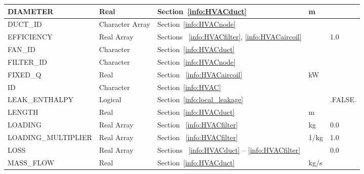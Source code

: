 \documentclass[11pt]{book}
\begin{document}
\begin{longtable}{@{\extracolsep{\fill}}|l|l|l|l|l|}
{\ct DIAMETER}                  & Real              & Section~\ref{info:HVACduct}                                                   &  m            &                \\ \hline
{\ct DUCT\_ID}                  & Character Array   & Section~\ref{info:HVACnode}                                                   &               &                \\ \hline
{\ct EFFICIENCY}                & Real Array        & Sections ~\ref{info:HVACfilter}, \ref{info:HVACaircoil}                       &               & 1.0            \\ \hline
{\ct FAN\_ID}                   & Character         & Section~\ref{info:HVACduct}                                                   &               &                \\ \hline
{\ct FILTER\_ID}                & Character         & Section~\ref{info:HVACnode}                                                   &               &                \\ \hline
{\ct FIXED\_Q}                  & Real              & Section ~\ref{info:HVACaircoil}                                               & kW            &                \\ \hline
{\ct ID}                        & Character         & Section~\ref{info:HVAC}                                                       &               &                \\ \hline
{\ct LEAK\_ENTHALPY}            & Logical           & Section~\ref{info:local_leakage}                                                   &               & {\ct .FALSE.}  \\ \hline
{\ct LENGTH}                    & Real              & Section~\ref{info:HVACduct}                                                   &  m            &                \\ \hline
{\ct LOADING}                   & Real Array        &  Section ~\ref{info:HVACfilter}                                               & kg            & 0.0            \\ \hline
{\ct LOADING\_MULTIPLIER}       & Real Array        &  Section ~\ref{info:HVACfilter}                                               & 1/kg          & 1.0            \\ \hline
{\ct LOSS}                      & Real Array        & Sections ~\ref{info:HVACduct} -- \ref{info:HVACfilter}                        &               & 0.0            \\ \hline
{\ct MASS\_FLOW  }              & Real              & Section~\ref{info:HVACduct}                                                   &  kg/s         &                \\ \hline

\end{longtable}
\end{document}
